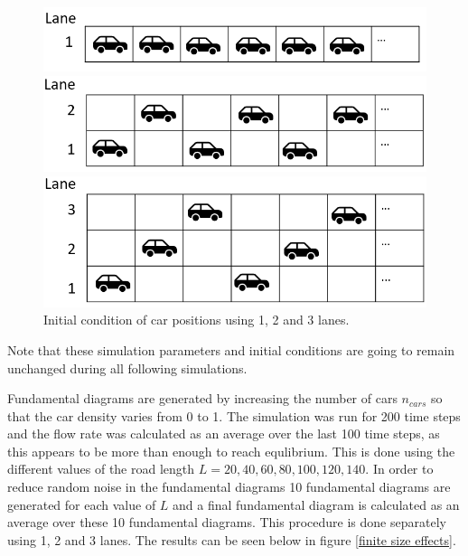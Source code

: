 \documentclass[a4paper,12pt]{article}
\begin{document}
\begin{figure}[H]
    \centering
    \begin{minipage}{1\textwidth}
        \centering
        \includegraphics[scale=0.5]{Images/ic 1 lane.png}
    \end{minipage}

    \centering
    \begin{minipage}{1\textwidth}
        \centering
        \includegraphics[scale=0.5]{Images/ic 2 lanes.png}
    \end{minipage}

    \centering
    \begin{minipage}{1\textwidth}
        \centering
        \includegraphics[scale=0.5]{Images/ic 3 lanes.png}
    \end{minipage}%
    \caption{Initial condition of car positions using 1, 2 and 3 lanes.}
    \label{initial conditions}
\end{figure}

Note that these simulation parameters and initial conditions are going to remain unchanged during all following simulations.

Fundamental diagrams are generated by increasing the number of cars $n_{cars}$ so that the car density varies from 0 to 1. 
The simulation was run for 200 time steps and the flow rate was calculated as an average over the last 100 time steps, as this appears to be 
more than enough to reach equlibrium.
This is done using the different values of the road length $L=20, 40, 60, 80, 100, 120, 140$. In order to reduce random noise in the fundamental diagrams
10 fundamental diagrams are generated for each value of $L$ and a final fundamental diagram is calculated as an average over these 10 fundamental diagrams.
This procedure is done separately using 1, 2 and 3 lanes.
The results can be seen below in figure \ref*{finite size effects}.
\end{document}
